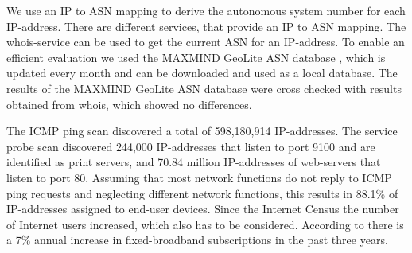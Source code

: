 We use an IP to ASN mapping to derive the autonomous system number for each IP-address. There are different services, that provide an IP to ASN mapping.
The whois-service can be used to get the current ASN for an IP-address.
To enable an efficient evaluation we used the MAXMIND GeoLite ASN database \cite{geo_ip}, which is updated every month and can be downloaded and used as a local database.
The results of the MAXMIND GeoLite ASN database were cross checked with results obtained from whois, which showed no differences.

The ICMP ping scan discovered a total of 598,180,914 IP-addresses.
The service probe scan discovered 244,000 IP-addresses that listen to port 9100 and are identified as print servers, and 70.84 million IP-addresses of web-servers that listen to port 80.
Assuming that most network functions do not reply to ICMP ping requests and neglecting different network functions, this results in 88.1\% of IP-addresses assigned to end-user devices.
Since the Internet Census the number of Internet users increased, which also has to be considered.
According to \cite{itu2015facts} there is a 7\% annual increase in fixed-broadband subscriptions in the past three years.

%

